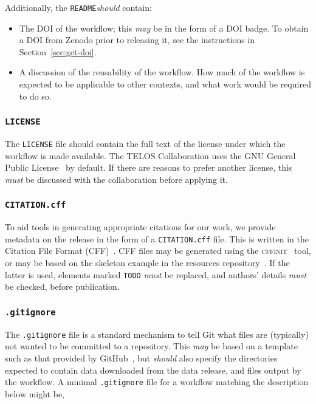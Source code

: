 \documentclass{article}
\newcommand\rfcword[1]{\emph{#1}\xspace}
\newcommand\must{\rfcword{must}}
\newcommand\should{\rfcword{should}}
\newcommand\may{\rfcword{may}}
\newcommand\filename[1]{\texttt{#1}\xspace}
\newcommand\readme{\filename{README}\xspace}
\newcommand\program[1]{\textsc{#1}\xspace}
\begin{document}
Additionally,
the \readme \should contain:

\begin{itemize}
  \item
        The DOI of the workflow;
        this \may be in the form of a DOI badge.
        To obtain a DOI from Zenodo prior to releasing it,
        see the instructions in Section~\ref{sec:get-doi}.
  \item
        A discussion of the reusability of the workflow.
        How much of the workflow is expected to be applicable to other contexts,
        and what work would be required to do so.
\end{itemize}

\subsubsection{\filename{LICENSE}}

The \filename{LICENSE} file should contain
the full text of the license under which the workflow is made available.
The TELOS Collaboration uses the GNU General Public License~\cite{gpl} by default.
If there are reasons to prefer another license,
this \must be discussed with the collaboration before applying it.

\subsubsection{\filename{CITATION.cff}}

To aid tools in generating appropriate citations for our work,
we provide metadata on the release in the form of a \filename{CITATION.cff} file.
This is written in the Citation File Format (CFF)~\cite{cff}.
CFF files may be generated using the \program{cffinit}~\cite{cffinit} tool,
or may be based on the skeleton example in the resources repository~\cite{resources}.
If the latter is used,
elements marked \verb|TODO| \must be replaced,
and authors' details \must be checked,
before publication.

\subsubsection{\filename{.gitignore}}

The \filename{.gitignore} file is a standard mechanism to tell Git
what files are
(typically)
not wanted to be committed to a repository.
This \may be based on a template such as that provided by GitHub~\cite{gitignore-python},
but \should also specify the directories expected to contain
data downloaded from the data release,
and files output by the workflow.
A minimal \filename{.gitignore} file for a workflow matching the description below might be,
\end{document}
